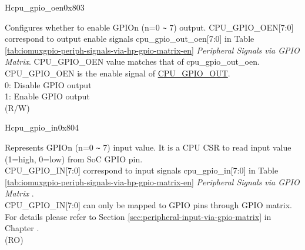 \begin{register}{H}{cpu\_gpio\_oen}{0x803}\label{regdesc:GPIO_OEN}
%
%
%
%
%
%
%
%
%
\regnewline%
\begin{regdesc}\begin{reglist}
\label{fielddesc:GPIO_OEN}\item [CPU\_GPIO\_OEN] Configures whether to enable GPIOn (n=0 \verb+~+ 7) output. CPU\_GPIO\_OEN[7:0] correspond to output enable signals cpu\_gpio\_out\_oen[7:0] in Table \ref{tab:iomuxgpio-periph-signals-via-hp-gpio-matrix-en} \textit{Peripheral Signals via GPIO Matrix}. CPU\_GPIO\_OEN value matches that of cpu\_gpio\_out\_oen.
CPU\_GPIO\_OEN is the enable signal of \hyperref[fielddesc:GPIO_OUT]{CPU\_GPIO\_OUT}.\\
0: Disable GPIO output\\
1: Enable GPIO output\\
(R/W)
\end{reglist}\end{regdesc}
\end{register}

\begin{register}{H}{cpu\_gpio\_in}{0x804}\label{regdesc:GPIO_IN}
%
%
%
%
%
%
%
%
%
\regnewline%
\begin{regdesc}\begin{reglist}
\label{fielddesc:GPIO_IN}\item [CPU\_GPIO\_IN] Represents GPIOn (n=0 \verb+~+ 7) input value. It is a CPU CSR to read input value (1=high, 0=low) from SoC GPIO pin.\\
CPU\_GPIO\_IN[7:0] correspond to input signals cpu\_gpio\_in[7:0] in Table \ref{tab:iomuxgpio-periph-signals-via-hp-gpio-matrix-en} \textit{Peripheral Signals via GPIO Matrix} .\\
CPU\_GPIO\_IN[7:0] can only be mapped to GPIO pins through GPIO matrix. For details please refer to Section \ref{sec:peripheral-input-via-gpio-matrix} in Chapter \textit{}.\\
(RO)
\end{reglist}\end{regdesc}
\end{register}


